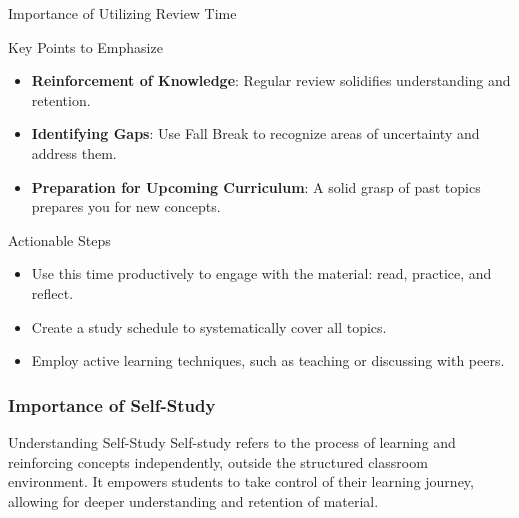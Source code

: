\documentclass[aspectratio=169]{beamer}
\begin{document}
\begin{frame}[fragile]{Importance of Utilizing Review Time}
    \begin{block}{Key Points to Emphasize}
        \begin{itemize}
            \item \textbf{Reinforcement of Knowledge}: Regular review solidifies understanding and retention.
            \item \textbf{Identifying Gaps}: Use Fall Break to recognize areas of uncertainty and address them.
            \item \textbf{Preparation for Upcoming Curriculum}: A solid grasp of past topics prepares you for new concepts.
        \end{itemize}
    \end{block}

    \begin{block}{Actionable Steps}
        \begin{itemize}
            \item Use this time productively to engage with the material: read, practice, and reflect.
            \item Create a study schedule to systematically cover all topics.
            \item Employ active learning techniques, such as teaching or discussing with peers.
        \end{itemize}
    \end{block}
\end{frame}

\begin{frame}[fragile]
  \frametitle{Importance of Self-Study}
  \begin{block}{Understanding Self-Study}
    Self-study refers to the process of learning and reinforcing concepts independently, outside the structured classroom environment. It empowers students to take control of their learning journey, allowing for deeper understanding and retention of material.
  \end{block}
\end{frame}
\end{document}
